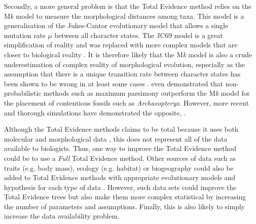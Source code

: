 Secondly, a more general problem is that the Total Evidence method relies on the M\textit{k} model \citep{lewisa2001} to measure the morphological distances among taxa.
This model is a generalisation of the Jukes-Cantor evolutionary model \citep[JC69;][]{jukes1969evolution} that allows a single mutation rate $\mu$ between all character states.
The JC69 model is a great simplification of reality and was replaced with more complex models that are closer to biological reality \citep[e.g. the GTR model that allows a different rate for each different type of nucleotide change;][]{tavare1986}.
It is therefore likely that the M\textit{k} model is also a crude underestimation of complex reality of morphological evolution, especially as the assumption that there is a unique transition rate between character states has been shown to be wrong in at least some cases \citep[e.g. for Dollo traits that are traits that have been observed to evolve from only one state \textit{a} to \textit{b} but never from \textit{b} to \textit{a};][]{WrightDollo}.
\cite{spencerefficacy2013} even demonstrated that non-probabilistic methods such as maximum parsimony outperform the M\textit{k} model for the placement of contentious fossils such as \textit{Archaeopteryx}.
However, more recent and thorough simulations have demonstrated the opposite, %
\citep{wrightbayesian2014}.  

Although the Total Evidence methods claims to be total because it uses both molecular and morphological data \citep{eernissetaxonomic1993}, this does not represent all of the data available to biologists.
Thus, one way to improve the Total Evidence method could be to use a \textit{Full} Total Evidence method.
Other sources of data such as traits (e.g. body mass), ecology (e.g. habitat) or biogeography could also be added to Total Evidence methods with appropriate evolutionary models and hypothesis for each type of data \citep[e.g. respectively quantitative, multiple or geographic state speciation and extinction model -- Qua-Mu-GeoSSE models;][]{fitzjohndiversitree2012}.
However, such data sets could improve the Total Evidence trees but also make them more complex statistical by increasing the number of parameters and assumptions.
Finally, this is also likely to simply increase the data availability problem.

